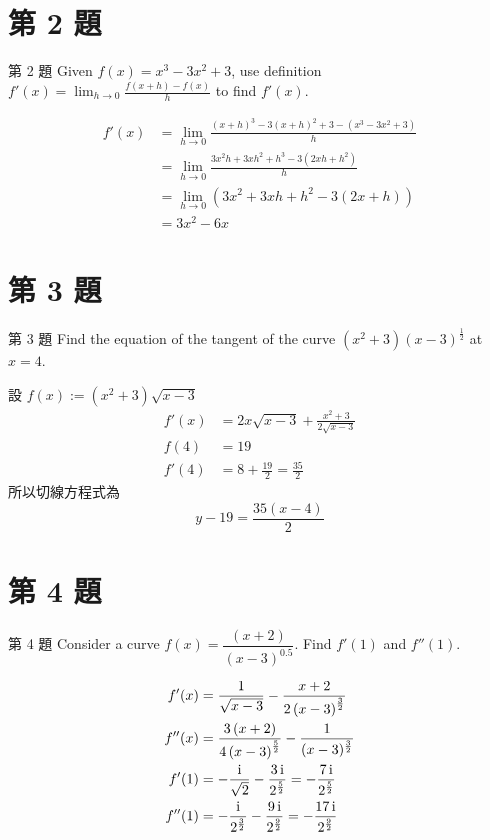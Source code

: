 \documentclass{beamer}
\begin{document}
\begin{CJK}{UTF8}{bsmi}
\section{第 2 題}
\begin{frame}{第 2 題}
  Given $f(x) = x^3 - 3x^2 + 3$, use definition $\displaystyle f'(x) = \lim_{h\to0} \frac{f(x+h) - f(x)}{h}$ to find $f'(x)$.
  \begin{solution}
    \begin{align*}
      f'(x) &= \lim_{h\to0} \frac{(x+h)^3 - 3 \left(x+h \right)^2 + 3 - \left( x^3 - 3x^2 + 3 \right)}{h}\\
	&= \lim_{h\to0} \frac{3x^2 h + 3xh^2 + h^3 - 3 \left( 2xh + h^2 \right)}{h}\\
	&= \lim_{h\to0} \left( 3x^2 + 3xh + h^2 - 3 \left( 2x + h \right) \right)\\
	&= 3x^2 - 6x
    \end{align*}
  \end{solution}
\end{frame}

\section{第 3 題}
\begin{frame}{第 3 題}
  Find the equation of the tangent of the curve $\left( x^2 + 3 \right) (x - 3)^{\frac12}$ at $x = 4$.
  \begin{solution}
    設 $f(x) := \left( x^2 + 3 \right) \sqrt{x - 3}$
    \begin{align*}
      f'(x) &= 2x \sqrt{x-3} + \frac{x^2 + 3}{2 \sqrt{x-3}}\\
      f(4) &= 19\\
      f'(4) &= 8 + \frac{19}{2} = \frac{35}{2}
    \end{align*}
    所以切線方程式為
    \[y - 19 = \frac{35 \left( x-4 \right)}{2}\]
  \end{solution}
\end{frame}

\section{第 4 題}
\begin{frame}{第 4 題}
  Consider a curve $f(x) = \dfrac{(x+2)}{(x-3)^{0.5}}$. Find $f'(1)$ and $f''(1)$.
  \begin{solution}
    \begin{align*}
      f'(x) &= \frac{1}{\sqrt{x-3}} - \frac{x+2}{2 \left( x-3 \right)^{\frac32}}\\
      f''(x) &= \frac{3 \left( x+2 \right)}{4 \left( x-3 \right)^{\frac52}} - \frac{1}{(x-3)^{\frac32}} \\
      f'(1) &= -\frac{\textup i}{\sqrt2} - \frac{3\,\textup i}{2^{\frac52}} = -\frac{7\,\textup i}{2^{\frac52}}\\
      f''(1) &= -\frac{\textup i}{2^{\frac32}} - \frac{9\,\textup i}{2^{\frac92}} = -\frac{17\,\textup i}{2^{\frac92}}
    \end{align*}
  \end{solution}
\end{frame}


\end{CJK}
\end{document}
